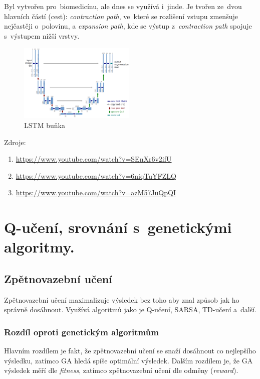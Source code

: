 Byl vytvořen pro~biomedicínu, ale dnes se využívá i~jinde.
Je tvořen ze~dvou hlavních částí (cest):
\emph{contraction path}, ve~které se rozlišení vstupu zmenšuje nejčastěji o~polovinu, a
\emph{expansion path}, kde se výstup z~\emph{contraction path} spojuje s~výstupem nižší vrstvy.

\begin{figure}[h]
    \centering
	\includegraphics[height=10em]{images/09_unet.png}
    \caption{LSTM buňka}
    \label{LSTM}
\end{figure}

Zdroje:
\begin{enumerate}
    \item \url{https://www.youtube.com/watch?v=SEnXr6v2ifU}
    \item \url{https://www.youtube.com/watch?v=6niqTuYFZLQ}
    \item \url{https://www.youtube.com/watch?v=azM57JuQpQI}
\end{enumerate}


\clearpage
\section{Q-učení, srovnání s~genetickými algoritmy.}

\subsection{Zpětnovazební učení}

Zpětnovazební učení maximalizuje výsledek bez toho aby znal způsob jak ho správně dosáhnout.
Využívá algoritmů jako je Q-učení, SARSA, TD-učení a~další.

\subsubsection{Rozdíl oproti genetickým algoritmům}

Hlavním rozdílem je fakt, že zpětnovazební učení se snaží dosáhnout co nejlepšího výsledku, zatímco GA hledá spíše optimální výsledek.
Dalším rozdílem je, že GA výsledek měří dle \emph{fitness}, zatímco zpětnovazební učení dle odměny (\emph{reward}).

